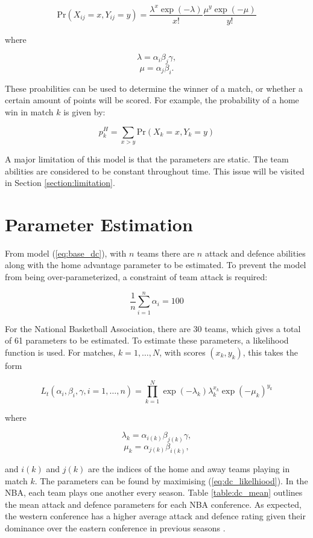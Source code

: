 \begin{equation}\label{eq:base_dc}
\text{Pr}(X_{ij}=x, Y_{ij} = y) = \frac{\lambda^x\exp(-\lambda)}{x!}\frac{\mu^y\exp(-\mu)}{y!}
\end{equation}

where

$$\lambda = \alpha_i\beta_j\gamma,$$
$$\mu = \alpha_j\beta_i.$$

These proabilities can be used to determine the winner of a match, or whether a certain amount of points will be scored.  For example, the probability of a home win in match $k$ is given by:

\begin{equation}
p_k^H = \sum_{x > y} \text{Pr}(X_k = x, Y_k = y)
\end{equation}

A major limitation of this model is that the parameters are static.  The team abilities are considered to be constant throughout time.  This issue will be visited in Section \ref{section:limitation}.


\section{Parameter Estimation}
From model (\ref{eq:base_dc}), with $n$ teams there are $n$ attack and defence abilities along with the home advantage parameter to be estimated.  To prevent the model from being over-parameterized, a constraint of team attack is required:

$$\frac{1}{n}\sum_{i=1}^{n}\alpha_i = 100$$

For the National Basketball Association, there are 30 teams, which gives a total of 61 parameters to be estimated.  To estimate these parameters, a likelihood function is used.  For matches, $k=1,\ldots,N$, with scores $(x_k, y_k)$, this takes the form

\begin{equation}\label{eq:dc_likelhiood}
L_t(\alpha_i, \beta_i,\gamma,i=1,\ldots,n) = \prod_{k=1}^{N} \exp(-\lambda_k)\lambda_{k}^{x_k}\exp(-\mu_k)^{y_k}
\end{equation}

where

$$\lambda_k = \alpha_{i(k)}\beta_{j(k)}\gamma,$$
$$\mu_k = \alpha_{j(k)}\beta_{i(k)},$$

and $i(k)$ and $j(k)$ are the indices of the home and away teams playing in match $k$.  The parameters can be found by maximising (\ref{eq:dc_likelhiood}).  In the NBA, each team plays one another every season.  Table \ref{table:dc_mean} outlines the mean attack and defence parameters for each NBA conference.  As expected, the western conference has a higher average attack and defence rating given their dominance over the eastern conference in previous seasons \citep{western_conference}.

